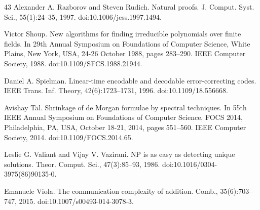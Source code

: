 \documentclass[10pt,a4paper]{article}
\begin{document}
\begin{thebibliography}{43}
Alexander A. Razborov and Steven Rudich. Natural proofs. J. Comput. Syst. Sci., 55(1):24–35, 1997. doi:10.1006/jcss.1997.1494.

Victor Shoup. New algorithms for finding irreducible polynomials over finite fields. In 29th Annual Symposium on Foundations of Computer Science, White Plains, New York, USA, 24-26 October 1988, pages 283–290. IEEE Computer Society, 1988. doi:10.1109/SFCS.1988.21944.

Daniel A. Spielman. Linear-time encodable and decodable error-correcting codes. IEEE Trans. Inf. Theory, 42(6):1723–1731, 1996. doi:10.1109/18.556668.

Avishay Tal. Shrinkage of de Morgan formulae by spectral techniques. In 55th IEEE Annual Symposium on Foundations of Computer Science, FOCS 2014, Philadelphia, PA, USA, October 18-21, 2014, pages 551–560. IEEE Computer Society, 2014. doi:10.1109/FOCS.2014.65.

Leslie G. Valiant and Vijay V. Vazirani. NP is as easy as detecting unique solutions. Theor. Comput. Sci., 47(3):85–93, 1986. doi:10.1016/0304-3975(86)90135-0.

Emanuele Viola. The communication complexity of addition. Comb., 35(6):703–747, 2015. doi:10.1007/s00493-014-3078-3.
\end{thebibliography}
\end{document}

